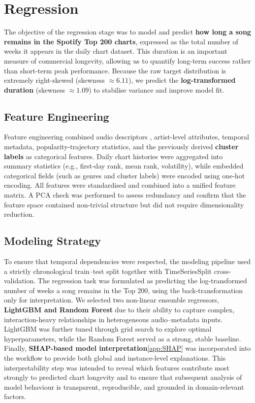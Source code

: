 \documentclass{article}
\begin{document}
\section{Regression}
\vspace{-0.6em}
The objective of the regression stage was to model and predict \textbf{how long a song remains in the Spotify Top 200 charts}, expressed as the total number of weeks it appears in the daily chart dataset. This duration is an important measure of commercial longevity, allowing us to quantify long-term success rather than short-term peak performance. Because the raw target distribution is extremely right-skewed (skewness $\approx 6.11$), we predict the \textbf{log-transformed duration} (skewness $\approx 1.09$) to stabilise variance and improve model fit.
\subsection{Feature Engineering}
Feature engineering combined audio descriptors \cite{lerch2022introduction}, artist-level attributes, temporal metadata, popularity-trajectory statistics, and the previously derived \textbf{cluster labels} as categorical features. Daily chart histories were aggregated into summary statistics (e.g., first-day rank, mean rank, volatility), while embedded categorical fields (such as genres and cluster labels) were encoded using one-hot encoding. All features were standardised and combined into a unified feature matrix. A PCA check was performed to assess redundancy and confirm that the feature space contained non-trivial structure but did not require dimensionality reduction.
\subsection{Modeling Strategy}
To ensure that temporal dependencies were respected, the modeling pipeline used a strictly chronological train–test split together with TimeSeriesSplit cross-validation. The regression task was formulated as predicting the log-transformed number of weeks a song remains in the Top 200, using the back-transformation only for interpretation. We selected two non-linear ensemble regressors, \textbf{LightGBM and Random Forest} \cite{kunapuli2023ensemble, konstantinov2021interpretable} due to their ability to capture complex, interaction-heavy relationships in heterogeneous audio–metadata inputs. LightGBM was further tuned through grid search to explore optimal hyperparameters, while the Random Forest served as a strong, stable baseline.\\
Finally, \textbf{SHAP-based model interpretation}\cite{lundberg2017unifiedapproachinterpretingmodel}\ref{app:SHAP} was incorporated into the workflow to provide both global and instance-level explanations. This interpretability step was intended to reveal which features contribute most strongly to predicted chart longevity and to ensure that subsequent analysis of model behaviour is transparent, reproducible, and grounded in domain-relevant factors.
\end{document}
